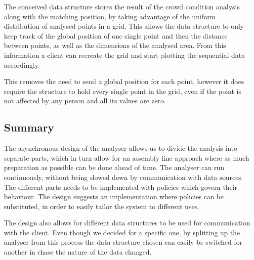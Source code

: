 The conceived data structure stores the result of the crowd condition analysis along with the matching position, by taking advantage of the uniform distribution of analysed points in a grid. This allows the data structure to only keep track of the global position of one single point and then the distance between points, as well as the dimensions of the analysed area. From this information a client can recreate the grid and start plotting the sequential data accordingly.

This removes the need to send a global position for each point, however it does require the structure to hold every single point in the grid, even if the point is not affected by any person and all its values are zero.

\subsection{Summary}
The asynchronous design of the analyser allows us to divide the analysis into separate parts, which in turn allow for an assembly line approach where as much preparation as possible can be done ahead of time. The analyser can run continuously, without being slowed down by communication with data sources. The different parts needs to be implemented with policies which govern their behaviour. The design suggests an implementation where policies can be substituted, in order to easily tailor the system to different uses.

The design also allows for different data structures to be used for communication with the client. Even though we decided for a specific one, by splitting up the analyser from this process the data structure chosen can easily be switched for another in chase the nature of the data changed.